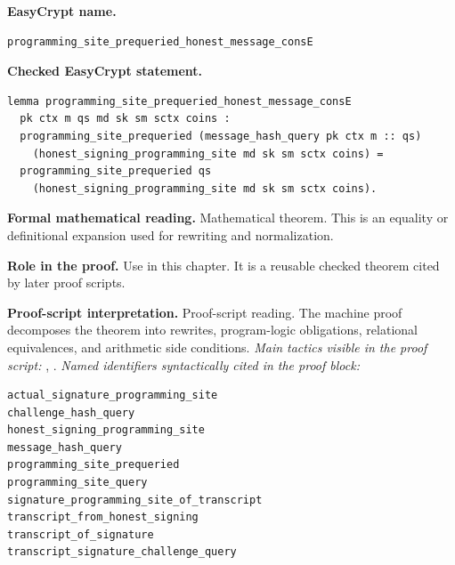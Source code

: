 \begin{formaltheorem}
\noindent\textbf{EasyCrypt name.}
\begin{lstlisting}[language=EasyCrypt,basicstyle=\ttfamily\scriptsize]
programming_site_prequeried_honest_message_consE
\end{lstlisting}
\noindent\textbf{Checked EasyCrypt statement.}
\begin{lstlisting}[language=EasyCrypt,basicstyle=\ttfamily\scriptsize]
lemma programming_site_prequeried_honest_message_consE
  pk ctx m qs md sk sm sctx coins :
  programming_site_prequeried (message_hash_query pk ctx m :: qs)
    (honest_signing_programming_site md sk sm sctx coins) =
  programming_site_prequeried qs
    (honest_signing_programming_site md sk sm sctx coins).
\end{lstlisting}
\noindent\textbf{Formal mathematical reading.}
Mathematical theorem. This is an equality or definitional expansion used for rewriting and normalization.

\noindent\textbf{Role in the proof.}
Use in this chapter. It is a reusable checked theorem cited by later proof scripts.

\noindent\textbf{Proof-script interpretation.}
Proof-script reading. The machine proof decomposes the theorem into rewrites, program-logic obligations, relational equivalences, and arithmetic side conditions.
\emph{Main tactics visible in the proof script:} , .
\emph{Named identifiers syntactically cited in the proof block:}
\begin{lstlisting}[language=EasyCrypt,basicstyle=\ttfamily\scriptsize]
actual_signature_programming_site
challenge_hash_query
honest_signing_programming_site
message_hash_query
programming_site_prequeried
programming_site_query
signature_programming_site_of_transcript
transcript_from_honest_signing
transcript_of_signature
transcript_signature_challenge_query
\end{lstlisting}

\end{formaltheorem}

